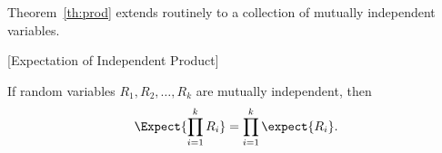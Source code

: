 \iffalse
\begin{proof}
The event $[R_1 \cdot R_2=r]$ can be split up into events of the form
$[R_1 = r_1\ \text{ and }\ R_2 = r_2]$ where $r_1\cdot r_2=r$.  So
\begin{align*}
\lefteqn{\expect{R_1 \cdot R_2}}\\
& \eqdef \sum_{r \in \range{R_1\cdot R_2}} r\cdot \pr{R_1\cdot R_2=r}\\
\iffalse
& =      \sum_{\scriptsize \begin{aligned}
                       r_1 \in \range{R_1},\\
                       r_2 \in \range{R_2}
                      \end{aligned}}\fi
& =      \sum_{r_i \in \range{R_i}}
            r_1 r_2 \cdot \pr{R_1=r_1\ \text{ and }\ R_2=r_2}\\
& =      \sum_{r_1 \in \range{R_1}} \sum_{r_2 \in \range{R_2}}
            r_1 r_2 \cdot \pr{R_1=r_1\ \text{ and }\ R_2=r_2}
                    &\text{(ordering terms in the sum)}\\
& =      \sum_{r_1 \in \range{R_1}} \sum_{r_2 \in \range{R_2}}
            r_1 r_2 \cdot \pr{R_1=r_1}\cdot \pr{R_2=r_2}
                    &\text{(indep.\ of $R_1,R_2$)}\\
& =      \sum_{r_1 \in \range{R_1}} \paren{r_1\pr{R_1=r_1} \cdot
              \sum_{r_2 \in \range{R_2}} r_2 \pr{R_2=r_2}}
                    &\text{(factoring out $r_1\pr{R_1=r_1}$)}\\
& =      \sum_{r_1 \in \range{R_1}} r_1\pr{R_1=r_1} \cdot \expect{R_2}
                    &\text{(def of $\expect{R_2}$)}\\
& =       \expect{R_2} \cdot \sum_{r_1 \in \range{R_1}} r_1\pr{R_1=r_1}
                    &\text{(factoring out $\expect{R_2}$)}\\
& =       \expect{R_2} \cdot  \expect{R_1}.
                    &\text{(def of $\expect{R_1}$)}
\end{align*}

\end{proof}
\fi

Theorem~\ref{th:prod} extends routinely to a collection of mutually
independent variables.
\begin{corollary}\label{cor:indep_prod}[Expectation of Independent Product]

If random variables $R_1, R_2, \dots, R_k$ are mutually
independent, then
\[
\Expect{\prod_{i=1}^k R_i} = \prod_{i=1}^k \expect{R_i}.
\]
\end{corollary}


